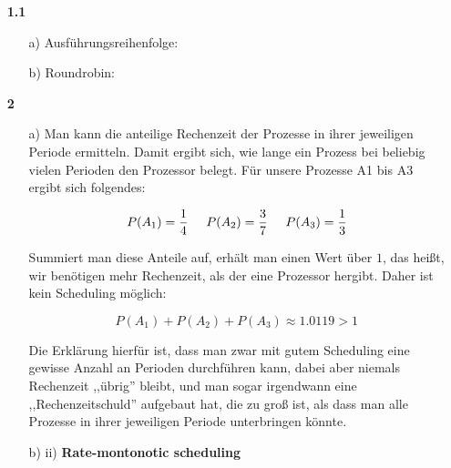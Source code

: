 \documentclass[a4paper,11pt]{article}
\author{\authorinfo}
\title{\titleinfo}
\date{\today}
\begin{document}
\maketitle


\begin{enumerate}
\item[\textbf{1.1}]

\begin{itemize}
    \item[a)] Ausführungsreihenfolge:
    \begin{figure}[h]
        \scalebox{0.5}{}
    \end{figure}
    \item[b)] Roundrobin:
    \begin{figure}[h]
        \scalebox{0.5}{}
    \end{figure}
\end{itemize}

\item[\textbf{2}]

\begin{itemize}
    \item[a)]
        Man kann die anteilige Rechenzeit der Prozesse in ihrer jeweiligen Periode
        ermitteln. Damit ergibt sich, wie lange ein Prozess bei beliebig vielen
        Perioden den Prozessor belegt. Für unsere Prozesse A1 bis A3 ergibt sich
        folgendes:

        $$P(A_1) = \frac{1}{4} \hspace{0.5cm} P(A_2) = \frac{3}{7} \hspace{0.5cm} P(A_3) = \frac{1}{3}$$

        Summiert man diese Anteile auf, erhält man einen Wert über $1$, das heißt,
        wir benötigen mehr Rechenzeit, als der eine Prozessor hergibt. Daher ist
        kein Scheduling möglich:

        $$P(A_1) + P(A_2) + P(A_3) \approx 1.0119 > 1$$

        Die Erklärung hierfür ist, dass man zwar mit gutem Scheduling eine gewisse
        Anzahl an Perioden durchführen kann, dabei aber niemals Rechenzeit ,,übrig''
        bleibt, und man sogar irgendwann eine ,,Rechenzeitschuld'' aufgebaut hat,
        die zu groß ist, als dass man alle Prozesse in ihrer jeweiligen Periode
        unterbringen könnte.

    \item[b) ii)]
        \textbf{Rate-montonotic scheduling}


\end{itemize}
\end{enumerate}
\end{document}

